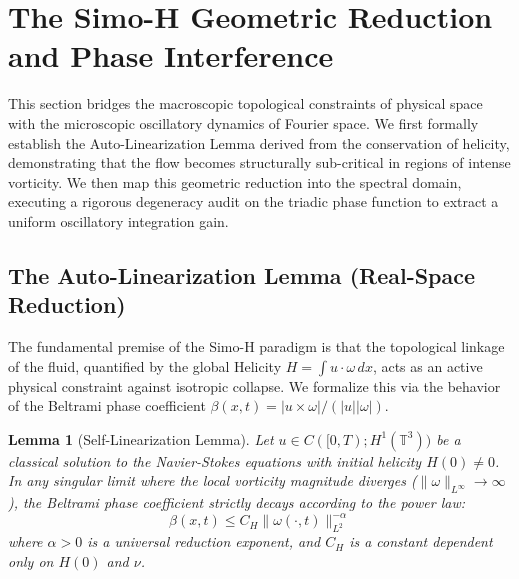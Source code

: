 \documentclass[12pt,a4paper]{article}
\theoremstyle{plain}
\newtheorem{lemma}[theorem]{Lemma}
\theoremstyle{definition}
\theoremstyle{remark}
\begin{document}
\section{The Simo-H Geometric Reduction and Phase Interference}

This section bridges the macroscopic topological constraints of physical space with the microscopic oscillatory dynamics of Fourier space. We first formally establish the Auto-Linearization Lemma derived from the conservation of helicity, demonstrating that the flow becomes structurally sub-critical in regions of intense vorticity. We then map this geometric reduction into the spectral domain, executing a rigorous degeneracy audit on the triadic phase function to extract a uniform oscillatory integration gain.

\subsection{The Auto-Linearization Lemma (Real-Space Reduction)}
The fundamental premise of the Simo-H paradigm is that the topological linkage of the fluid, quantified by the global Helicity $H = \int u \cdot \omega \, dx$, acts as an active physical constraint against isotropic collapse. We formalize this via the behavior of the Beltrami phase coefficient $\beta(x,t) = |u \times \omega| / (|u||\omega|)$.

\begin{lemma}[Self-Linearization Lemma]\label{lem:auto_linearization}
Let $u \in C([0,T); H^1(\mathbb{T}^3))$ be a classical solution to the Navier-Stokes equations with initial helicity $H(0) \neq 0$. In any singular limit where the local vorticity magnitude diverges ($\|\omega\|_{L^\infty} \to \infty$), the Beltrami phase coefficient strictly decays according to the power law:
\begin{equation}
    \beta(x,t) \leq C_H \|\omega(\cdot, t)\|_{L^2}^{-\alpha}
\end{equation}
where $\alpha > 0$ is a universal reduction exponent, and $C_H$ is a constant dependent only on $H(0)$ and $\nu$.
\end{lemma}
\end{document}
